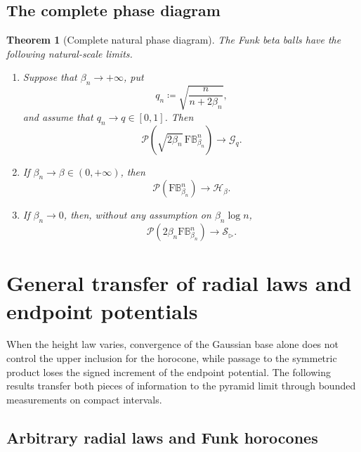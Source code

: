 \documentclass[10pt,a4paper]{amsart}
\numberwithin{equation}{section}
\newtheorem{theorem}{Theorem}[section]
\newcommand{\BetaBall}{\mathrm F\mathbb B^n_{\beta_n}}
\newcommand{\Pyr}{\mathcal P}
\begin{document}
\subsection{The complete phase diagram}

\begin{theorem}[Complete natural phase diagram]\label{thm:main}
The Funk beta balls have the following natural-scale limits.
\begin{enumerate}[label=\textup{(\roman*)}]
\item Suppose that $\beta_n\to+\infty$, put
\begin{equation}\label{eq:qn} q_n\coloneqq\sqrt{\frac{n}{n+2\beta_n}}, \end{equation}
and assume that $q_n\to q\in[0,1]$.  Then
\begin{equation}\label{eq:gaussian-limit} \Pyr(\sqrt{2\beta_n}\,\BetaBall)\longrightarrow\mathcal G_q. \end{equation}
\item If $\beta_n\to\beta\in(0,+\infty)$, then
\begin{equation}\label{eq:fixed-beta-limit} \Pyr(\BetaBall)\longrightarrow\mathcal H_\beta. \end{equation}
\item If $\beta_n\to0$, then, without any assumption on $\beta_n\log n$,
\begin{equation}\label{eq:small-beta-limit} \Pyr(2\beta_n\BetaBall)\longrightarrow\mathcal S_{\rhd}. \end{equation}
\end{enumerate}
\end{theorem}

\section{General transfer of radial laws and endpoint potentials}\label{sec:general-transfer}

When the height law varies, convergence of the Gaussian base alone does not control the upper inclusion for the horocone,
while passage to the symmetric product loses the signed increment of the endpoint potential.  The following results transfer
both pieces of information to the pyramid limit through bounded measurements on compact intervals.

\subsection{Arbitrary radial laws and Funk horocones}
\end{document}
